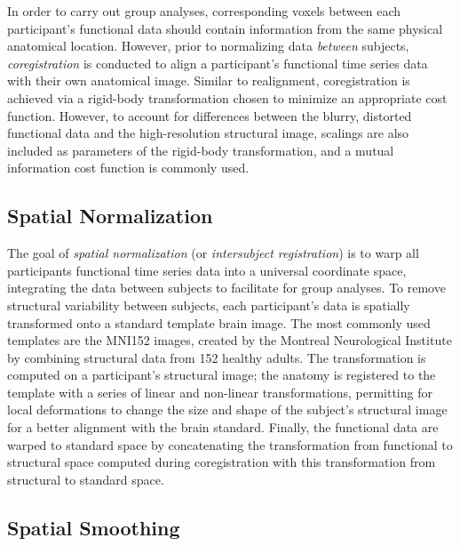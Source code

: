 In order to carry out group analyses, corresponding voxels between each participant's functional data should contain information from the same physical anatomical location. However, prior to normalizing data \textit{between} subjects, \textit{coregistration} is conducted to align a participant's functional time series data with their own anatomical image. Similar to realignment, coregistration is achieved via a rigid-body transformation chosen to minimize an appropriate cost function. However, to account for differences between the blurry, distorted functional data and the high-resolution structural image, scalings are also included as parameters of the rigid-body transformation, and a mutual information cost function is commonly used.    

\subsection{Spatial Normalization}

The goal of \textit{spatial normalization} (or \textit{intersubject registration}) is to warp all participants functional time series data into a universal coordinate space, integrating the data between subjects to facilitate for group analyses. To remove structural variability between subjects, each participant's data is spatially transformed onto a standard template brain image. The most commonly used templates are the MNI152 images, created by the Montreal Neurological Institute by combining structural data from 152 healthy adults. The transformation is computed on a participant's structural image; the anatomy is registered to the template with a series of linear and non-linear transformations, permitting for local deformations to change the size and shape of the subject's structural image for a better alignment with the brain standard. Finally, the functional data are warped to standard space by concatenating the transformation from functional to structural space computed during coregistration with this transformation from structural to standard space. 

\subsection{Spatial Smoothing}


